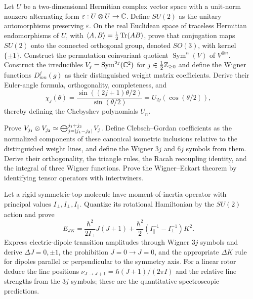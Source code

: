 \begin{exercise}
Let $U$ be a two-dimensional Hermitian complex vector space with a unit-norm
nonzero alternating form $\varepsilon:U\otimes U\to\mathbb C$.  Define $SU(2)$ as
the unitary automorphisms preserving $\varepsilon$.  On the real Euclidean
space of traceless Hermitian endomorphisms of $U$, with
$\langle A,B\rangle=\tfrac12\operatorname{Tr}(AB)$, prove that conjugation maps
$SU(2)$ onto the connected orthogonal group, denoted $SO(3)$, with kernel
$\{\pm1\}$.  Construct the
permutation coinvariant quotient $\operatorname{Sym}^n(V)$ of $V^{\otimes n}$.
Construct the irreducibles $V_j=\operatorname{Sym}^{2j}(\mathbb C^2)$ for
$j\in\frac12\mathbb Z_{\ge0}$ and define the Wigner functions
$D^j_{mn}(g)$ as their distinguished weight matrix coefficients.  Derive
their Euler-angle formula, orthogonality, completeness, and
\[
 \chi_j(\theta)=\frac{\sin((2j+1)\theta/2)}{\sin(\theta/2)}
                =U_{2j}(\cos(\theta/2)),
\]
thereby defining the Chebyshev polynomials $U_n$.
\end{exercise}

\begin{exercise}
Prove
$V_{j_1}\otimes V_{j_2}\simeq
\bigoplus_{j=\left\lvert j_1-j_2\right\rvert}^{j_1+j_2}V_j$.
Define Clebsch--Gordan coefficients as the normalized components of these
canonical isometric inclusions relative to the distinguished weight lines,
and define the Wigner $3j$ and $6j$ symbols from them.  Derive their
orthogonality, the triangle rules, the Racah recoupling identity, and the
integral of three Wigner functions.  Prove the Wigner--Eckart theorem by
identifying tensor operators with intertwiners.
\end{exercise}

\begin{exercise}
Let a rigid symmetric-top molecule have moment-of-inertia operator with
principal values $I_\perp,I_\perp,I_\parallel$.  Quantize its rotational
Hamiltonian by the $SU(2)$ action and prove
\[
 E_{JK}=\frac{\hbar^2}{2I_\perp}J(J+1)
 +\frac{\hbar^2}{2}\left(I_\parallel^{-1}-I_\perp^{-1}\right)K^2.
\]
Express electric-dipole transition amplitudes through Wigner $3j$ symbols and
derive $\Delta J=0,\pm1$, the prohibition $J=0\to J=0$, and the appropriate
$\Delta K$ rule for dipoles parallel or perpendicular to the symmetry axis.
For a linear rotor deduce the line positions
$\nu_{J\to J+1}=\hbar(J+1)/(2\pi I)$ and the relative line strengths from the
$3j$ symbols; these are the quantitative spectroscopic predictions.
\end{exercise}

